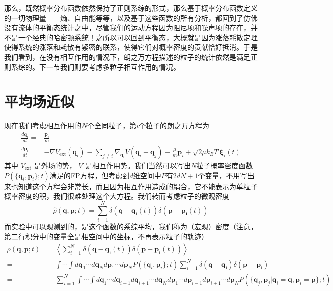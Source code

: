 \documentclass{ctexart}
\newcommand\non{\nonumber \\}
\begin{document}
那么，既然概率分布函数依然保持了正则系综的形式，那么基于概率分布函数定义的一切物理量——熵、自由能等等，以及基于这些函数的所有分析，都回到了仿佛没有流体的平衡态统计之中，尽管我们的运动方程因为阻尼项和噪声项的存在，并不是一个经典的哈密顿系统！之所以可以回到平衡态，大概就是因为涨落耗散定理使得系统的涨落和耗散有紧密的联系，使得它们对概率密度的贡献恰好抵消。于是我们看到，在没有相互作用的情况下，朗之万方程描述的粒子的统计依然是满足正则系综的。下一节我们则要考虑多粒子相互作用的情况。

\section{平均场近似}

现在我们考虑相互作用的$N$个全同粒子，第$i$个粒子的朗之万方程为
\begin{align} 
\frac{d\bm{q}_i}{dt}=&\frac{\bm{p}_i}{m}\\ 
\frac{d\bm{p}_i}{dt}=&-\nabla V_{\mathrm{ext}}(\bm{q}_i)-\sum_{j\neq i}\nabla_{\bm{q}_i} V(\bm{q}_i-\bm{q}_j)-\frac{\mu}{m}\bm{p}_i+\sqrt{2\mu k_BT}\bm{\xi}_i(t) 
\end{align}
其中 $V_{\mathrm{ext}}$ 是外场的势， $V$ 是相互作用势。我们当然可以写出$N$粒子概率密度函数 $P(\{\bm{q}_i,\bm{p}_i\};t)$满足的FP方程，但考虑到$d$维空间中$P$有$2dN+1$个变量，不用写出来也知道这个方程会非常长，而且因为相互作用造成的耦合，它不能表示为单粒子概率密度的积，我们很难处理这个大方程。我们转而考虑粒子的微观密度
\begin{equation}
\hat{\rho}(\bm{q},\bm{p};t)=\sum_{i=1}^N\delta(\bm{q}-\bm{q_i}(t))\delta(\bm{p}-\bm{p_i}(t))
\end{equation}
而实验中可以观测到的，是这个函数的系综平均，我们称为（宏观）密度（注意，第二行积分中的变量全是相空间中的坐标，不再表示粒子的轨迹）
\begin{align} 
\rho(\bm{q},\bm{p};t)=&\left\langle\sum_{i=1}^N\delta(\bm{q}-\bm{q_i}(t))\delta(\bm{p}-\bm{p_i}(t))\right\rangle \non
 =&\int\cdots\int d\bm{q}_1\cdots d\bm{q}_Nd\bm{p}_1\cdots d\bm{p}_N P(\{\bm{q}_i,\bm{p}_i\};t)\sum_{i=1}^N\delta(\bm{q}-\bm{q_i})\delta(\bm{p}-\bm{p_i}) \non
 =&\sum_{i=1}^N\int\cdots\int d\bm{q}_1\cdots d\bm{q}_{i-1}d\bm{q}_{i+1}\cdots d\bm{q}_Nd\bm{p}_1\cdots d\bm{p}_{i-1}d\bm{p}_{i+1}\cdots d\bm{p}_N P(\{\bm{q}_j,\bm{p}_j|\bm{q}_i=\bm{q},\bm{p}_i=\bm{p}\};t)
\end{align}
\end{document}
